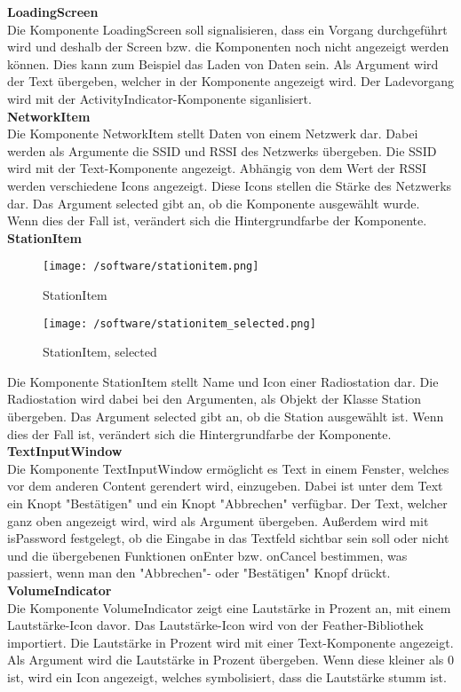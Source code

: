 \documentclass[]{article}
\begin{document}
\textbf{LoadingScreen} \\
Die Komponente LoadingScreen soll signalisieren, dass ein Vorgang durchgeführt wird und deshalb der Screen bzw. die Komponenten noch nicht angezeigt werden können. Dies kann zum Beispiel das Laden von Daten sein. Als Argument wird der Text übergeben, welcher in der Komponente angezeigt wird. Der Ladevorgang wird mit der ActivityIndicator-Komponente siganlisiert. \newline \\
\textbf{NetworkItem} \\
Die Komponente NetworkItem stellt Daten von einem Netzwerk dar. Dabei werden als Argumente die SSID und RSSI des Netzwerks übergeben. Die SSID wird mit der Text-Komponente angezeigt. Abhängig von dem Wert der RSSI werden verschiedene Icons angezeigt. Diese Icons stellen die Stärke des Netzwerks dar. Das Argument selected gibt an, ob die Komponente ausgewählt wurde. Wenn dies der Fall ist, verändert sich die Hintergrundfarbe der Komponente. \newline \\
\textbf{StationItem} \\
\begin{figure}[H]
\begin{flushleft}
\texttt{[image: /software/stationitem.png]}
\caption{StationItem}
\texttt{[image: /software/stationitem\_selected.png]}
\caption{StationItem, selected}
\end{flushleft}
\end{figure}
Die Komponente StationItem stellt Name und Icon einer Radiostation dar. Die Radiostation wird dabei bei den Argumenten, als Objekt der Klasse Station übergeben. Das Argument selected gibt an, ob die Station ausgewählt ist. Wenn dies der Fall ist, verändert sich die Hintergrundfarbe der Komponente. \newline \\
\textbf{TextInputWindow} \\
Die Komponente TextInputWindow ermöglicht es Text in einem Fenster, welches vor dem anderen Content gerendert wird, einzugeben. Dabei ist unter dem Text ein Knopt "Bestätigen" und ein Knopt "Abbrechen" verfügbar. Der Text, welcher ganz oben angezeigt wird, wird als Argument übergeben. Außerdem wird mit isPassword festgelegt, ob die Eingabe in das Textfeld sichtbar sein soll oder nicht und die übergebenen Funktionen onEnter bzw. onCancel bestimmen, was passiert, wenn man den "Abbrechen"- oder "Bestätigen" Knopf drückt. \newline \\
\textbf{VolumeIndicator} \\
Die Komponente VolumeIndicator zeigt eine Lautstärke in Prozent an, mit einem Lautstärke-Icon davor. Das Lautstärke-Icon wird von der Feather-Bibliothek importiert. Die Lautstärke in Prozent wird mit einer Text-Komponente angezeigt. Als Argument wird die Lautstärke in Prozent übergeben. Wenn diese kleiner als 0 ist, wird ein Icon angezeigt, welches symbolisiert, dass die Lautstärke stumm ist.
\end{document}
